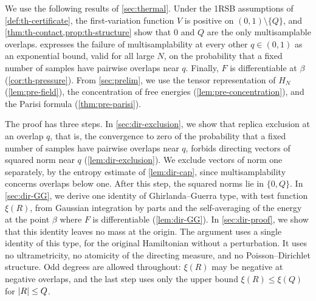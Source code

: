 We use the following results of \cref{sec:thermal}. Under the 1RSB assumptions of \cref{def:th-certificate}, the first-variation function $V$ is positive on $(0,1)\setminus\{Q\}$, and \cref{thm:th-contact,prop:th-structure} show that $0$ and $Q$ are the only multisamplable overlaps.  expresses the failure of multisamplability at every other $q\in(0,1)$ as an exponential bound, valid for all large $N$, on the probability that a fixed number of samples have pairwise overlaps near $q$. Finally, $F$ is differentiable at $\beta$ (\cref{cor:th-pressure}). From \cref{sec:prelim}, we use the tensor representation of $H_N$ (\cref{lem:pre-field}), the concentration of free energies (\cref{lem:pre-concentration}), and the Parisi formula (\cref{thm:pre-parisi}).

The proof has three steps. In \cref{sec:dir-exclusion}, we show that replica exclusion at an overlap $q$, that is, the convergence to zero of the probability that a fixed number of samples have pairwise overlaps near $q$, forbids directing vectors of squared norm near $q$ (\cref{lem:dir-exclusion}). We exclude vectors of norm one separately, by the entropy estimate of \cref{lem:dir-cap}, since multisamplability concerns overlaps below one. After this step, the squared norms lie in $\{0,Q\}$. In \cref{sec:dir-GG}, we derive one identity of Ghirlanda--Guerra type, with test function $\xi(R)$, from Gaussian integration by parts and the self-averaging of the energy at the point $\beta$ where $F$ is differentiable (\cref{lem:dir-GG}). In \cref{sec:dir-proof}, we show that this identity leaves no mass at the origin. The argument uses a single identity of this type, for the original Hamiltonian without a perturbation. It uses no ultrametricity, no atomicity of the directing measure, and no Poisson--Dirichlet structure. Odd degrees are allowed throughout: $\xi(R)$ may be negative at negative overlaps, and the last step uses only the upper bound $\xi(R)\le\xi(Q)$ for $\left|R\right|\le Q$.

